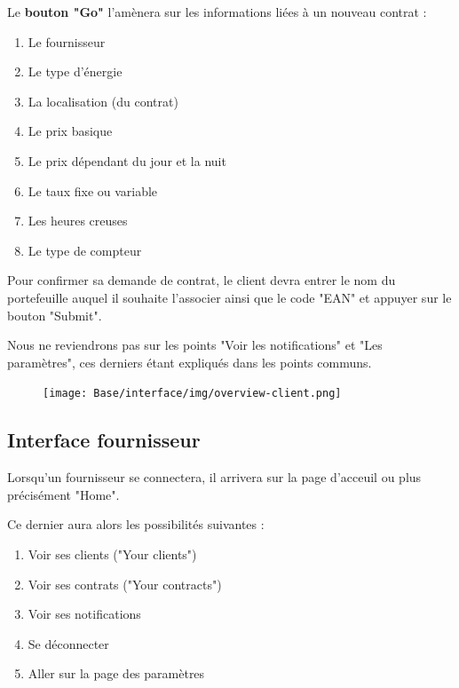 \begin{flushleft}
Le \textbf{bouton "Go"} l'amènera sur les informations liées à un nouveau contrat :
\end{flushleft}
\begin{enumerate}
\item Le fournisseur
\item Le type d'énergie
\item La localisation (du contrat)
\item Le prix basique
\item Le prix dépendant du jour et la nuit
\item Le taux fixe ou variable
\item Les heures creuses
\item Le type de compteur
\end{enumerate}
\begin{flushleft}
Pour confirmer sa demande de contrat, le client devra entrer le nom du portefeuille auquel il souhaite l'associer ainsi que le code "EAN" et appuyer sur le bouton "Submit".
\end{flushleft}

\begin{flushleft}
Nous ne reviendrons pas sur les points "Voir les notifications" et "Les paramètres", ces derniers étant expliqués dans les points communs. 
\end{flushleft}

\begin{figure}
    \centering
    \texttt{[image: Base/interface/img/overview-client.png]}
\end{figure}

\newpage
\subsection{Interface fournisseur}

Lorsqu'un fournisseur se connectera, il arrivera sur la page d'acceuil ou plus précisément "Home".
\begin{flushleft}
Ce dernier aura alors les possibilités suivantes :
\end{flushleft}
\begin{enumerate}
\item Voir ses clients ("Your clients")
\item Voir ses contrats ("Your contracts")
\item Voir ses notifications
\item Se déconnecter
\item Aller sur la page des paramètres
\end{enumerate}

